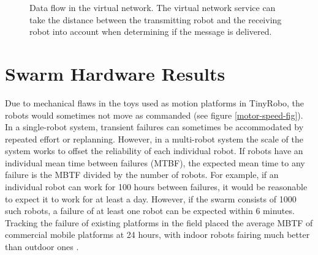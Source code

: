  \begin{figure}
 	\centering
	\caption{Data flow in the virtual network. The virtual network service can take the distance between the transmitting robot and the receiving robot into account when determining if the message is delivered.}
 \end{figure}

\section{Swarm Hardware Results} \label{section:The_Desert_of_the_Real}

Due to mechanical flaws in the toys used as motion platforms in TinyRobo, the robots would sometimes not move as commanded (see figure \ref{motor-speed-fig}). 
In a single-robot system, transient failures can sometimes be accommodated by repeated effort or replanning. 
However, in a multi-robot system the scale of the system works to offset the reliability of each individual robot. 
If robots have an individual mean time between failures (MTBF), the expected mean time to any failure is the MBTF divided by the number of robots. 
For example, if an individual robot can work for 100 hours between failures, it would be reasonable to expect it to work for at least a day. 
However, if the swarm consists of 1000 such robots, a failure of at least one robot can be expected within 6 minutes. 
Tracking the failure of existing platforms in the field placed the average MBTF of commercial mobile platforms at 24 hours, with indoor robots fairing much better than outdoor ones \citep{carlson2004follow}.



